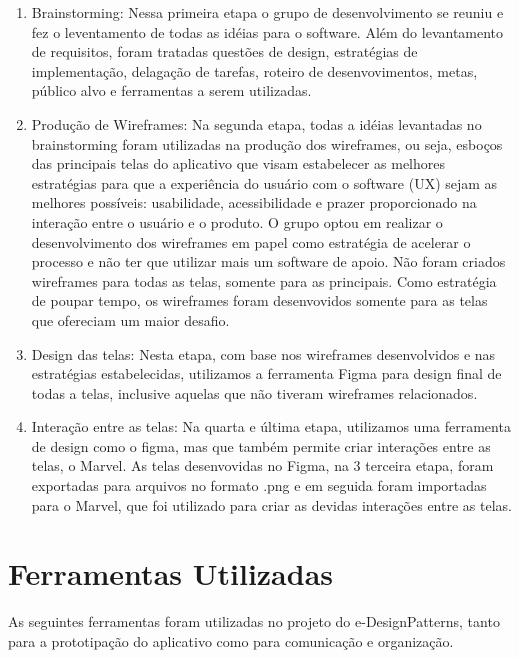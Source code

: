 \begin{enumerate}
	\item Brainstorming: Nessa primeira etapa o grupo de desenvolvimento se reuniu e fez o leventamento de todas as idéias para o software. Além do levantamento de requisitos, foram tratadas questões de design, estratégias de implementação, delagação de tarefas, roteiro de desenvovimentos, metas, público alvo e ferramentas a serem utilizadas. 
	\item Produção de Wireframes: Na segunda etapa, todas a idéias levantadas no brainstorming foram utilizadas na produção dos wireframes, ou seja, esboços das principais telas do aplicativo que visam estabelecer as melhores estratégias para que a experiência do usuário com o software (UX) sejam as melhores possíveis: usabilidade, acessibilidade e prazer proporcionado na interação entre o usuário e o produto. O grupo optou em realizar o desenvolvimento dos wireframes em papel como estratégia de acelerar o processo e não ter que utilizar mais um software de apoio. Não foram criados wireframes para todas as telas, somente para as principais. Como estratégia de poupar tempo, os wireframes foram desenvovidos somente para as telas que ofereciam um maior desafio.
	\item Design das telas: Nesta etapa, com base nos wireframes desenvolvidos e nas estratégias estabelecidas, utilizamos a ferramenta Figma para design final de todas a telas, inclusive aquelas que não tiveram wireframes relacionados. 
	\item Interação entre as telas: Na quarta e última etapa, utilizamos uma ferramenta de design como o figma, mas que também permite criar interações entre as telas, o Marvel. As telas desenvovidas no Figma, na 3 terceira etapa, foram exportadas para arquivos no formato .png e em seguida foram importadas para o Marvel, que foi utilizado para criar as devidas interações entre as telas.
\end{enumerate}


\section{Ferramentas Utilizadas}

As seguintes ferramentas foram utilizadas no projeto do e-DesignPatterns, tanto para a prototipação do aplicativo como para comunicação e organização.

